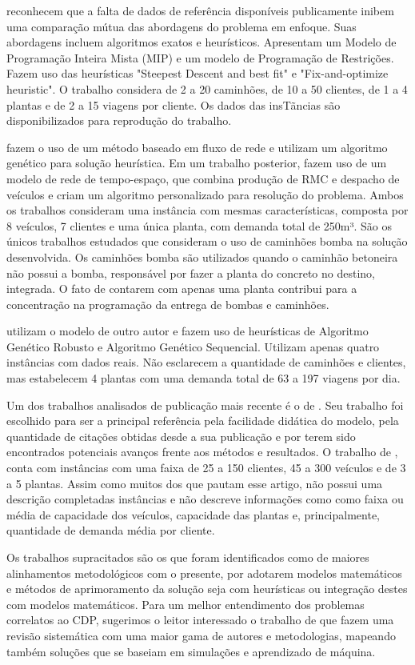\cite{kinable} reconhecem que a falta de dados de referência disponíveis publicamente inibem uma comparação mútua das abordagens do problema em enfoque. Suas abordagens incluem algoritmos exatos e heurísticos. Apresentam um Modelo de Programação Inteira Mista (MIP) e um modelo de Programação de Restrições. Fazem uso das heurísticas "Steepest Descent and best fit" e "Fix-and-optimize heuristic". O trabalho considera de 2 a 20 caminhões, de 10 a 50 clientes, de 1 a 4 plantas e de 2 a 15 viagens por cliente. Os dados das insTãncias são disponibilizados para reprodução do trabalho.

\cite{tabref10} fazem o uso de um método baseado em fluxo de rede e utilizam um algoritmo genético para solução heurística. Em um trabalho posterior, \cite{tabref12} fazem uso de um modelo de rede de tempo-espaço, que combina produção de RMC e despacho de veículos e criam um algoritmo personalizado para resolução do problema. Ambos os trabalhos consideram uma instância com mesmas características, composta por 8 veículos, 7 clientes e uma única planta, com demanda total de 250m³. São os únicos trabalhos estudados que consideram o uso de caminhões bomba na solução desenvolvida. Os caminhões bomba são utilizados quando o caminhão betoneira não possui a bomba, responsável por fazer a planta do concreto no destino, integrada. O fato de contarem com apenas uma planta contribui para a concentração na programação da entrega de bombas e caminhões.


\cite{tabref11} utilizam o modelo de outro autor e fazem uso de heurísticas de Algoritmo Genético Robusto e Algoritmo Genético Sequencial. Utilizam apenas quatro instâncias com dados reais. Não esclarecem a quantidade de caminhões e clientes, mas estabelecem 4 plantas com uma demanda total de 63 a 197 viagens por dia.


Um dos trabalhos analisados de publicação mais recente é o de \cite{cantu}. Seu trabalho foi escolhido para ser a principal referência pela facilidade didática do modelo, pela quantidade de citações obtidas desde a sua publicação e por terem sido encontrados potenciais avanços frente aos métodos e resultados. O trabalho de \cite{cantu}, conta com instâncias com uma faixa de 25 a 150 clientes, 45 a 300 veículos e de 3 a 5 plantas. Assim como muitos dos que pautam esse artigo, não possui uma descrição completadas instâncias e não descreve informações como como faixa ou média de capacidade dos veículos, capacidade das plantas e, principalmente, quantidade de demanda média por cliente.

Os trabalhos supracitados são os que foram identificados como de maiores alinhamentos metodológicos com o presente, por adotarem modelos matemáticos e métodos de aprimoramento da solução seja com heurísticas ou integração destes com modelos matemáticos. Para um melhor entendimento dos problemas correlatos ao CDP, sugerimos
o leitor interessado o trabalho de \cite{tzanetos} que fazem uma revisão sistemática com uma maior gama de autores e metodologias, mapeando também soluções que se baseiam em simulações e aprendizado de máquina. 

